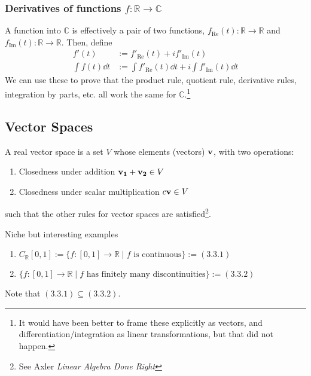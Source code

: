 \subsubsection{Derivatives of functions $f: \mathbb{R} \to \mathbb{C}$}
A function into $\mathbb{C}$ is effectively a pair of two functions, $f_\text{Re} (t): \mathbb{R} \to \mathbb{R}$ and $f_\text{Im} (t): \mathbb{R} \to \mathbb{R}$. Then, define
\begin{align}
    f'(t) &:= f'_\text{Re}(t) + i f'_\text{Im}(t)\\
    \int f(t) \dd{t} &:= \int f'_\text{Re}(t)\dd{t} + i \int f'_\text{Im}(t)\dd{t}
\end{align}
We can use these to prove that the product rule, quotient rule, derivative rules, integration by parts, etc. all work the same for $\mathbb{C}$.\footnote{It would have been better to frame these explicitly as vectors, and differentiation/integration as linear transformations, but that did not happen.}

\subsection{Vector Spaces}
\begin{definition}
    A real vector space is a set $V$ whose elements (vectors) $\vb{v}$, with two operations:
    \begin{enumerate}
        \item Closedness under addition $\vb{v_1} + \vb{v_2} \in V$
        \item Closedness under scalar multiplication $c\vb{v} \in V$
    \end{enumerate}
    such that the other rules for vector spaces are satisfied\footnote{See Axler \textit{Linear Algebra Done Right}}.
\end{definition}
Niche but interesting examples
\begin{enumerate}
    \item $C_\mathbb{R}[0,1] := \{ f: [0,1] \to \mathbb{R} \mid f \text{ is continuous}\} := (3.3.1)$
    \item $\{ f: [0,1] \to \mathbb{R} \mid f \text{ has finitely many discontinuities}\} := (3.3.2)$
\end{enumerate}
Note that $(3.3.1) \subseteq (3.3.2)$.